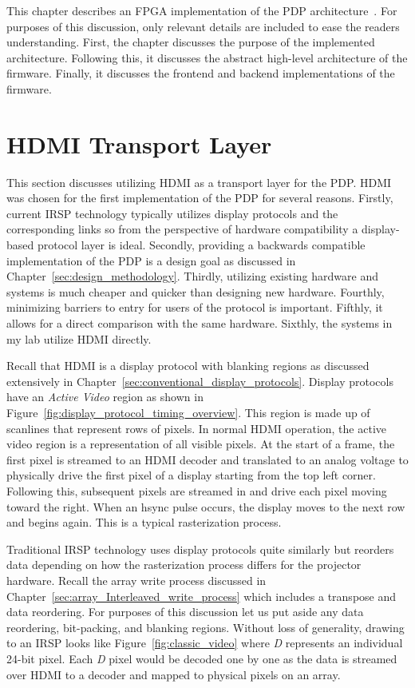 \label{chap:implementation}

This chapter describes an FPGA implementation of the PDP architecture~\cite{LandwehrEtAl2019_2,JacksonEtAl2019,BrowningEtAl2020}. For purposes of this discussion, only relevant details are included to ease the readers understanding. First, the chapter discusses the purpose of the implemented architecture. Following this, it discusses the abstract high-level architecture of the firmware. Finally, it discusses the frontend and backend implementations of the firmware.

\section{HDMI Transport Layer}
    \label{sec:hdmi_transport_layer}

    This section discusses utilizing HDMI as a transport layer for the PDP. HDMI was chosen for the first implementation of the PDP for several reasons. Firstly, current IRSP technology typically utilizes display protocols and the corresponding links so from the perspective of hardware compatibility a display-based protocol layer is ideal. Secondly, providing a backwards compatible implementation of the PDP is a design goal as discussed in Chapter~\ref{sec:design_methodology}. Thirdly, utilizing existing hardware and systems is much cheaper and quicker than designing new hardware. Fourthly, minimizing barriers to entry for users of the protocol is important. Fifthly, it allows for a direct comparison with the same hardware. Sixthly, the systems in my lab utilize HDMI directly.

    Recall that HDMI is a display protocol with blanking regions as discussed extensively in Chapter~\ref{sec:conventional_display_protocols}. Display protocols have an {\it Active Video} region as shown in Figure~\ref{fig:display_protocol_timing_overview}. This region is made up of scanlines that represent rows of pixels. In normal HDMI operation, the active video region is a representation of all visible pixels. At the start of a frame, the first pixel is streamed to an HDMI decoder and translated to an analog voltage to physically drive the first pixel of a display starting from the top left corner. Following this, subsequent pixels are streamed in and drive each pixel moving toward the right. When an hsync pulse occurs, the display moves to the next row and begins again. This is a typical rasterization process.

    Traditional IRSP technology uses display protocols quite similarly but reorders data depending on how the rasterization process differs for the projector hardware. Recall the array write process discussed in Chapter~\ref{sec:array_Interleaved_write_process} which includes a transpose and data reordering. For purposes of this discussion let us put aside any data reordering, bit-packing, and blanking regions. Without loss of generality, drawing to an IRSP looks like Figure~\ref{fig:classic_video} where {\it D} represents an individual 24-bit pixel. Each {\it D} pixel would be decoded one by one as the data is streamed over HDMI to a decoder and mapped to physical pixels on an array.

